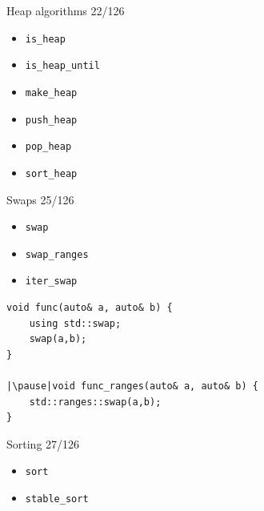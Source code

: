 \documentclass[aspectratio=169]{beamer}
\begin{document}
\begin{frame}{Heap algorithms 22/126}
  \begin{itemize}
    \item{\texttt{is_heap}}
    \item{\texttt{is_heap_until}}
    \item{\texttt{make_heap}}
    \item{\texttt{push_heap}}
    \item{\texttt{pop_heap}}
    \item{\texttt{sort_heap}}
  \end{itemize}
\end{frame}

\begin{frame}{Swaps 25/126}
  \begin{itemize}
    \item{\texttt{swap}}
    \item{\texttt{swap_ranges}}
    \item{\texttt{iter_swap}}
  \end{itemize}
\end{frame}

\begin{frame}[fragile]{}
\begin{verbatim}
void func(auto& a, auto& b) {
    using std::swap;
    swap(a,b);
}

|\pause|void func_ranges(auto& a, auto& b) {
    std::ranges::swap(a,b);
}
\end{verbatim}
\end{frame}

\begin{frame}{Sorting 27/126}
  \begin{itemize}
    \item{\texttt{sort}}
    \item{\texttt{stable_sort}}
  \end{itemize}
\end{frame}
\end{document}
